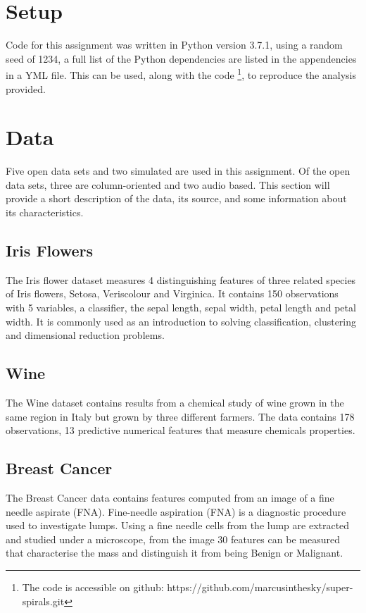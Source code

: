 \documentclass[12pt]{article}
\begin{document}
\section{Setup}
Code for this assignment was written in Python version 3.7.1, using a random seed of 1234, a full list of the Python dependencies are listed in the appendencies in a YML file.  This can be used, along with the code \footnote{The code is accessible on github: https://github.com/marcusinthesky/super-spirals.git}, to reproduce the analysis provided.  


\section{Data}
Five open data sets and two simulated are used in this assignment. Of the open data sets, three are column-oriented and two audio based. This section will provide a short description of the data, its source, and some information about its characteristics.

\subsection{Iris Flowers}

The Iris flower dataset \citep{fisher_1936} measures 4 distinguishing features of three related species of Iris flowers, Setosa, Veriscolour and Virginica. It contains 150 observations with 5 variables, a classifier, the sepal length, sepal width, petal length and petal width. It is commonly used as an introduction to solving classification, clustering and dimensional reduction problems. 

\subsection{Wine}
The Wine dataset \citep{aeberhard_coomans_de_vel_1992} contains results from a chemical study of wine grown in the same region in Italy but grown by three different farmers. The data contains 178 observations, 13 predictive numerical features that measure chemicals properties.

\subsection{Breast Cancer}
The Breast Cancer \citep{street_wolberg_mangasarian_1993} data contains features computed from an image of a fine needle aspirate (FNA). Fine-needle aspiration (FNA) is a diagnostic procedure used to investigate lumps. Using a fine needle cells from the lump are extracted and studied under a microscope, from the image 30 features can be measured that characterise the mass and distinguish it from being Benign or Malignant. 
\end{document}
